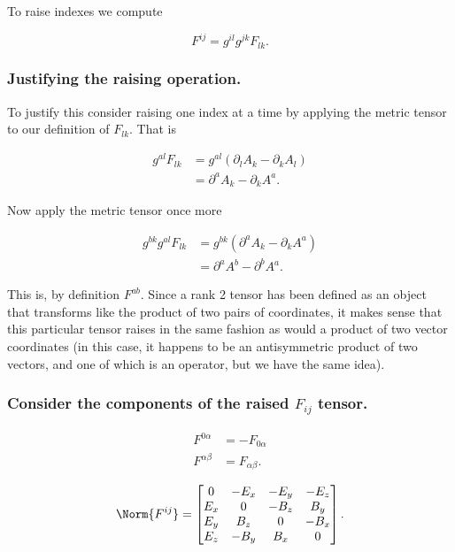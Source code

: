 To raise indexes we compute

\begin{equation}\label{eqn:relativisticElectrodynamicsL11:210}
F^{i j} = g^{i l} g^{j k} F_{l k}.
\end{equation}

\subsubsection{Justifying the raising operation.}
To justify this consider raising one index at a time by applying the metric tensor to our definition of $F_{l k}$.  That is

\begin{align*}
g^{a l} F_{l k} 
&=
g^{a l} (\partial_l A_k - \partial_k A_l) \\
&=
\partial^a A_k - \partial_k A^a.
\end{align*}

Now apply the metric tensor once more

\begin{align*}
g^{b k} g^{a l} F_{l k} 
&=
g^{b k} (\partial^a A_k - \partial_k A^a) \\
&=
\partial^a A^b - \partial^b A^a.
\end{align*}

This is, by definition $F^{a b}$.  Since a rank 2 tensor has been defined as an object that transforms like the product of two pairs of coordinates, it makes sense that this particular tensor raises in the same fashion as would a product of two vector coordinates (in this case, it happens to be an antisymmetric product of two vectors, and one of which is an operator, but we have the same idea).

\subsubsection{Consider the components of the raised $F_{i j}$ tensor.}

\begin{align}\label{eqn:relativisticElectrodynamicsL11:230}
F^{0\alpha} &= -F_{0\alpha} \\
F^{\alpha\beta} &= F_{\alpha\beta}.
\end{align}

\begin{equation}\label{eqn:relativisticElectrodynamicsL11:250}
\Norm{ F^{i j} } = 
\begin{bmatrix}
0 & -E_x & -E_y & -E_z \\
E_x & 0 & -B_z & B_y \\
E_y & B_z & 0 & -B_x \\
E_z & -B_y & B_x & 0
\end{bmatrix}.
\end{equation}

